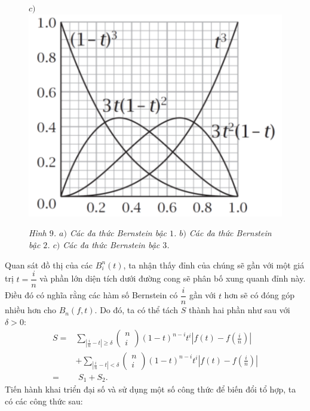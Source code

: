 \begin{multicols}{2}
\begin{figure}[H]
		\hspace*{15pt}$c)$\includegraphics[width= 0.89\linewidth]{19}
		\caption{\small\textit{\color{toanhocdoisong}Hình $9$. $a)$ Các đa thức Bernstein bậc $1$. $b)$ Các đa thức Bernstein bậc $2$. $c)$ Các đa thức Bernstein bậc $3$.}}
		\vspace*{-5pt}
	\end{figure}
	Quan sát đồ thị của các $B_i^n (t)$, ta nhận thấy đỉnh của chúng sẽ gần với một giá trị $t= \dfrac{i}{n}$ và phần lớn diện tích dưới đường cong sẽ phân bố xung quanh đỉnh này. Điều đó có nghĩa rằng các hàm số Bernstein có $\dfrac{i}{n}$ gần với $t$ hơn sẽ có đóng góp nhiều hơn cho $B_n (f,t)$. Do đó, ta có thể tách $S$ thành hai phần như sau với $ \delta >0$:
	\begin{align*}
		S =& \sum\limits_{\left| {\frac{i}{n} - t} \right| \ge \delta }\!\!\! \left(\!\!\!\! \begin{array}{l}
				n\\
				i
			\end{array}\!\!\!\! \right){{(1 \!-\! t)}^{n - i}}{t^i}\left| {f(t) - f\left( {\frac{i}{n}} \right)} \right| \\
		&+ \!\! \sum\limits_{\left| {\frac{i}{n} - t} \right| < \delta }\!\!\! \left(\!\!\!\! \begin{array}{l}
				n\\
				i
			\end{array}\!\!\!\! \right){{(1 \!-\! t)}^{n - i}}{t^i}\left| {f(t) \!-\! f\left(\! {\frac{i}{n}} \!\right)} \right|\\
		=&\,\, S_1 + S_2.
	\end{align*}
	Tiến hành khai triển đại số và sử dụng một số công thức để biến đổi tổ hợp, ta có các công thức sau:

\end{multicols}
